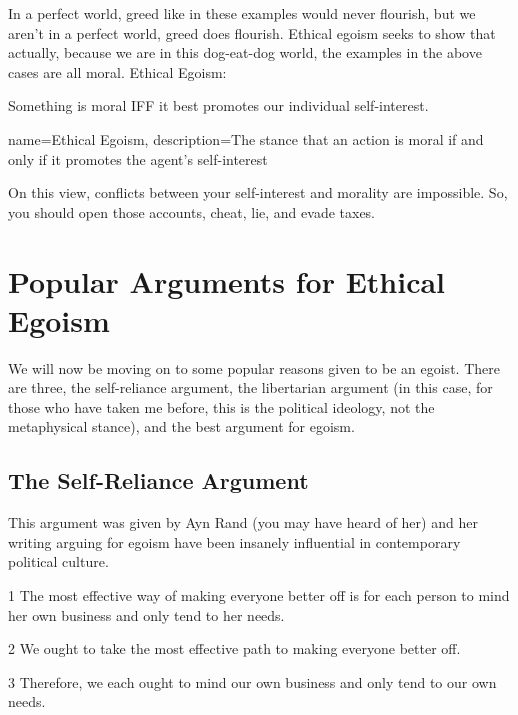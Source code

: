 
In a perfect world, greed like in these examples would never flourish, but we aren’t in a perfect world, greed does flourish. Ethical egoism seeks to show that actually, because we are in this dog-eat-dog world, the examples in the above cases are all moral. \gls{Ethical Egoism}:
\begin{center}
Something is moral IFF it best promotes our individual self-interest.
\end{center}

{
  name=Ethical Egoism,
  description={The stance that an action is moral if and only if it promotes the agent's self-interest}
}


On this view, conflicts between your self-interest and morality are impossible. So, you should open those accounts, cheat, lie, and evade taxes.

\section{Popular Arguments for Ethical Egoism}

We will now be moving on to some popular reasons given to be an egoist. There are three, the self-reliance argument, the libertarian argument (in this case, for those who have taken me before, this is the political ideology, not the metaphysical stance), and the best argument for egoism.

\subsection{The Self-Reliance Argument}

This argument was given by Ayn Rand (you may have heard of her) and her writing arguing for egoism have been insanely influential in contemporary political culture.

\begin{earg}
\item[1] The most effective way of making everyone better off is for each person to mind her own business and only tend to her needs.
\item[2] We ought to take the most effective path to making everyone better off.
\item[3] Therefore, we each ought to mind our own business and only tend to our own needs.
\end{earg}

